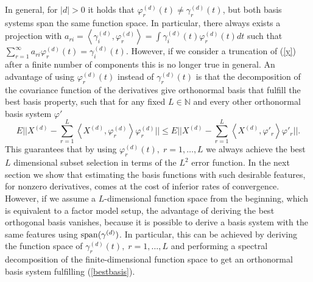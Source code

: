 In general, for $|d|>0$ it holds that $\varphi^{(d)}_r(t) \neq \gamma^{(d)}_r(t) $, but both basis systems span the same function space. In particular, there always exists a projection with $a_{ri}=\left\langle \gamma^{(d)}_i, \varphi^{(d)}_r\right\rangle = \int \gamma^{(d)}_i(t) \varphi^{(d)}_r(t) dt$ such that $ \sum_{r=1}^\infty a_{ri} \varphi^{(d)}_r(t) = \gamma^{(d)}_i(t)$. However, if we consider a truncation of (\ref{y}) after a finite number of components this is no longer true in general. An advantage of using $\varphi^{(d)}_r(t)$ instead of $\gamma^{(d)}_r(t) $ is that the decomposition of the covariance function of the derivatives give orthonormal basis that fulfill the best basis property, such that for any fixed $L \in \mathbb{N}$ and every other orthonormal basis system $ \varphi'$ 
\begin{equation}
\label{bestbasis}
E || X^{(d)} - \sum_{r=1}^L \left\langle X^{(d)},\varphi^{(d)}_r\right\rangle \varphi^{(d)}_r||  \leq E || X^{(d)} - \sum_{r=1}^L  \left\langle X^{(d)},\varphi'_r \right\rangle \varphi'_r||.
\end{equation}
This guarantees that by using $\varphi_r^{(d)}(t), \; r=1,\dots,L$ we always achieve the best $L$ dimensional subset selection in terms of the $L^2$ error function. In the next section we show that estimating the basis functions with such desirable features, for nonzero derivatives, comes at the cost of inferior rates of convergence. %
However, if we assume a $L$-dimensional function space from the beginning, which is equivalent to a factor model setup, the advantage of deriving the best orthogonal basis vanishes, because it is possible to derive a basis system with the same features using $\operatorname{span}(\gamma^{(d)})$. In particular, this can be achieved by deriving the function space of $\gamma^{(d)}_r(t), \; r=1,\dots,L$ and performing a spectral decomposition of the finite-dimensional function space to get an orthonormal basis system fulfilling (\ref{bestbasis}).


